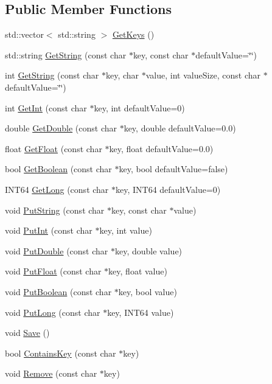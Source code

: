 \subsection*{Public Member Functions}
\begin{DoxyCompactItemize}
\item 
std::vector$<$ std::string $>$ \hyperlink{classPreferences_adfaa1b0d4e2317bbab416ad0e681d707}{GetKeys} ()
\item 
std::string \hyperlink{classPreferences_ad31cc879d70be5d64338fefa12e1a243}{GetString} (const char $\ast$key, const char $\ast$defaultValue=\char`\"{}\char`\"{})
\item 
int \hyperlink{classPreferences_ad2da52e665fe7c8fc70ce55d1a4b2895}{GetString} (const char $\ast$key, char $\ast$value, int valueSize, const char $\ast$defaultValue=\char`\"{}\char`\"{})
\item 
int \hyperlink{classPreferences_a5ca31ef76922a0fa26b8ded1e9291709}{GetInt} (const char $\ast$key, int defaultValue=0)
\item 
double \hyperlink{classPreferences_a06246f2b29a5015a7fb04dfa387d9727}{GetDouble} (const char $\ast$key, double defaultValue=0.0)
\item 
float \hyperlink{classPreferences_a20514b7b015c4b98ca999dc38d86608d}{GetFloat} (const char $\ast$key, float defaultValue=0.0)
\item 
bool \hyperlink{classPreferences_a4ee5292adb5b798e6acc3c184b1f2c2d}{GetBoolean} (const char $\ast$key, bool defaultValue=false)
\item 
INT64 \hyperlink{classPreferences_ab175a6bf8da0215476cc74cf4a8c5503}{GetLong} (const char $\ast$key, INT64 defaultValue=0)
\item 
void \hyperlink{classPreferences_ad75629afa66156aa009d73fa8933f8c3}{PutString} (const char $\ast$key, const char $\ast$value)
\item 
void \hyperlink{classPreferences_a0715c745aecfe942f37e0e8b19a8b404}{PutInt} (const char $\ast$key, int value)
\item 
void \hyperlink{classPreferences_aa268e1bfbde2c1957d3cca6b379d5da2}{PutDouble} (const char $\ast$key, double value)
\item 
void \hyperlink{classPreferences_a357246eabcaa351f7c2ad5c86a03fe0f}{PutFloat} (const char $\ast$key, float value)
\item 
void \hyperlink{classPreferences_a74bec1555c91e100ff9091484fcaac91}{PutBoolean} (const char $\ast$key, bool value)
\item 
void \hyperlink{classPreferences_a7cc71d0e62c873dccf59975b6720a3bc}{PutLong} (const char $\ast$key, INT64 value)
\item 
void \hyperlink{classPreferences_ae8ce1d8967e205e584e9cca1dbf86919}{Save} ()
\item 
bool \hyperlink{classPreferences_a7d9c2ec45d1966f06f92fc8383053b5d}{ContainsKey} (const char $\ast$key)
\item 
void \hyperlink{classPreferences_ae2b5f7567f130301c50869916571c81b}{Remove} (const char $\ast$key)
\end{DoxyCompactItemize}
